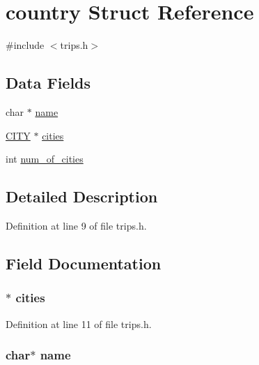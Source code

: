 \hypertarget{structcountry}{}\section{country Struct Reference}
\label{structcountry}


{\ttfamily \#include $<$trips.\+h$>$}

\subsection*{Data Fields}
\begin{DoxyCompactItemize}
\item 
char $\ast$ \hyperlink{structcountry_a5ac083a645d964373f022d03df4849c8}{name}
\item 
\hyperlink{cities_8h_aab2cece41c4817245db92da9a5aeeec8}{C\+I\+T\+Y} $\ast$ \hyperlink{structcountry_a494c19d33223667ddd30d2856427005c}{cities}
\item 
int \hyperlink{structcountry_abeadd002848341722eefd4a6a09e1e45}{num\+\_\+of\+\_\+cities}
\end{DoxyCompactItemize}


\subsection{Detailed Description}


Definition at line 9 of file trips.\+h.



\subsection{Field Documentation}
\hypertarget{structcountry_a494c19d33223667ddd30d2856427005c}{}
\subsubsection[{cities}]{$\ast$ cities}\label{structcountry_a494c19d33223667ddd30d2856427005c}


Definition at line 11 of file trips.\+h.

\hypertarget{structcountry_a5ac083a645d964373f022d03df4849c8}{}
\subsubsection[{name}]{\setlength{\rightskip}{0pt plus 5cm}char$\ast$ name}\label{structcountry_a5ac083a645d964373f022d03df4849c8}


